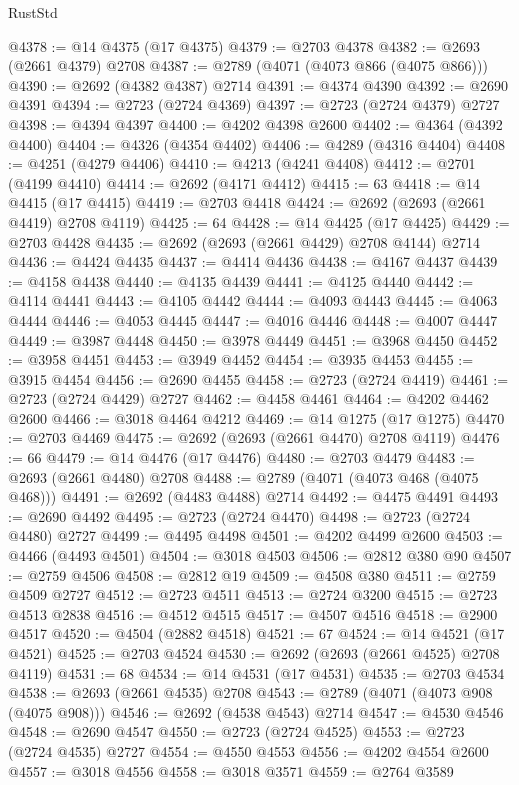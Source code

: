 \begin{lexlean}{RustStd}
\begin{coremodule}
{\begin{coremodule}
{{{{{{{{{{{{{{{{{{{{{{{{{{{{{{{{{{{{{{{@4378 := @14 @4375 (@17 @4375)
@4379 := @2703 @4378
@4382 := @2693 (@2661 @4379) @2708
@4387 := @2789 (@4071 (@4073 @866 (@4075 @866)))
@4390 := @2692 (@4382 @4387) @2714
@4391 := @4374 @4390
@4392 := @2690 @4391
@4394 := @2723 (@2724 @4369)
@4397 := @2723 (@2724 @4379) @2727
@4398 := @4394 @4397
@4400 := @4202 @4398 @2600
@4402 := @4364 (@4392 @4400)
@4404 := @4326 (@4354 @4402)
@4406 := @4289 (@4316 @4404)
@4408 := @4251 (@4279 @4406)
@4410 := @4213 (@4241 @4408)
@4412 := @2701 (@4199 @4410)
@4414 := @2692 (@4171 @4412)
@4415 := 63
@4418 := @14 @4415 (@17 @4415)
@4419 := @2703 @4418
@4424 := @2692 (@2693 (@2661 @4419) @2708 @4119)
@4425 := 64
@4428 := @14 @4425 (@17 @4425)
@4429 := @2703 @4428
@4435 := @2692 (@2693 (@2661 @4429) @2708 @4144) @2714
@4436 := @4424 @4435
@4437 := @4414 @4436
@4438 := @4167 @4437
@4439 := @4158 @4438
@4440 := @4135 @4439
@4441 := @4125 @4440
@4442 := @4114 @4441
@4443 := @4105 @4442
@4444 := @4093 @4443
@4445 := @4063 @4444
@4446 := @4053 @4445
@4447 := @4016 @4446
@4448 := @4007 @4447
@4449 := @3987 @4448
@4450 := @3978 @4449
@4451 := @3968 @4450
@4452 := @3958 @4451
@4453 := @3949 @4452
@4454 := @3935 @4453
@4455 := @3915 @4454
@4456 := @2690 @4455
@4458 := @2723 (@2724 @4419)
@4461 := @2723 (@2724 @4429) @2727
@4462 := @4458 @4461
@4464 := @4202 @4462 @2600
@4466 := @3018 @4464 @4212
@4469 := @14 @1275 (@17 @1275)
@4470 := @2703 @4469
@4475 := @2692 (@2693 (@2661 @4470) @2708 @4119)
@4476 := 66
@4479 := @14 @4476 (@17 @4476)
@4480 := @2703 @4479
@4483 := @2693 (@2661 @4480) @2708
@4488 := @2789 (@4071 (@4073 @468 (@4075 @468)))
@4491 := @2692 (@4483 @4488) @2714
@4492 := @4475 @4491
@4493 := @2690 @4492
@4495 := @2723 (@2724 @4470)
@4498 := @2723 (@2724 @4480) @2727
@4499 := @4495 @4498
@4501 := @4202 @4499 @2600
@4503 := @4466 (@4493 @4501)
@4504 := @3018 @4503
@4506 := @2812 @380 @90
@4507 := @2759 @4506
@4508 := @2812 @19
@4509 := @4508 @380
@4511 := @2759 @4509 @2727
@4512 := @2723 @4511
@4513 := @2724 @3200
@4515 := @2723 @4513 @2838
@4516 := @4512 @4515
@4517 := @4507 @4516
@4518 := @2900 @4517
@4520 := @4504 (@2882 @4518)
@4521 := 67
@4524 := @14 @4521 (@17 @4521)
@4525 := @2703 @4524
@4530 := @2692 (@2693 (@2661 @4525) @2708 @4119)
@4531 := 68
@4534 := @14 @4531 (@17 @4531)
@4535 := @2703 @4534
@4538 := @2693 (@2661 @4535) @2708
@4543 := @2789 (@4071 (@4073 @908 (@4075 @908)))
@4546 := @2692 (@4538 @4543) @2714
@4547 := @4530 @4546
@4548 := @2690 @4547
@4550 := @2723 (@2724 @4525)
@4553 := @2723 (@2724 @4535) @2727
@4554 := @4550 @4553
@4556 := @4202 @4554 @2600
@4557 := @3018 @4556
@4558 := @3018 @3571
@4559 := @2764 @3589
}}}}}}}}}}}}}}}}}}}}}}}}}}}}}}}}}}}}}}}
\end{coremodule}}
\end{coremodule}
\end{lexlean}
